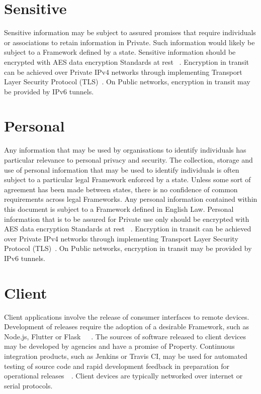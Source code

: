 \documentclass[11pt, oneside]{book}   	%
\begin{document}
\section{Sensitive}
Sensitive information may be subject to assured promises that require individuals or associations to retain information in Private.
Such information would likely be subject to a Framework defined by a state.
Sensitive information should be encrypted with AES data encryption Standards at rest ~\cite{aes}.
Encryption in transit can be achieved over Private IPv4 networks through implementing Transport Layer Security Protocol (TLS)~\cite{tlsp}.
On Public networks, encryption in transit may be provided by IPv6 tunnels.

\section{Personal}
Any information that may be used by organisations to identify individuals has particular relevance to personal privacy and security.
The collection, storage and use of personal information that may be used to identify individuals is often subject to a particular legal Framework enforced by a state.
Unless some sort of agreement has been made between states, there is no confidence of common requirements across legal Frameworks.
Any personal information contained within this document is subject to a Framework defined in English Law.
Personal information that is to be assured for Private use only should be encrypted with AES data encryption Standards at rest ~\cite{aes}.
Encryption in transit can be achieved over Private IPv4 networks through implementing Transport Layer Security Protocol (TLS)~\cite{tlsp}.
On Public networks, encryption in transit may be provided by IPv6 tunnels.

\section{Client}
Client applications involve the release of consumer interfaces to remote devices.
Development of releases require the adoption of a desirable Framework, such as Node.js, Flutter or Flask~\cite{node}~\cite{flutter}~\cite{flask}.
The sources of software released to client devices may be developed by agencies and have a promise of Property.
Continuous integration products, such as Jenkins or Travis CI, may be used for automated testing of source code and rapid development feedback in preparation for operational releases~\cite{jenkins}~\cite{travis}.
Client devices are typically networked over internet or serial protocols.\
\end{document}
